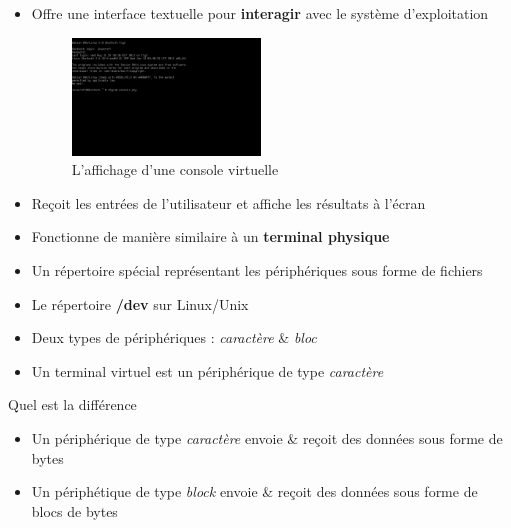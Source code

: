 \begin{frame}

	\begin{itemize}[<+->]
		\item Offre une interface textuelle pour \textbf{interagir} avec le système d'exploitation
			\begin{figure}
				\centering
				\includegraphics[width=5cm]{images/virtual_console.png}
				\caption{L'affichage d'une console virtuelle}
			\end{figure}
		\item Reçoit les entrées de l'utilisateur et affiche les résultats à l'écran

		\item Fonctionne de manière similaire à un \textbf{terminal physique}

	\end{itemize}

\end{frame}

\begin{frame}

	\begin{itemize}[<+->]

		\item Un répertoire spécial représentant les périphériques sous forme de fichiers

		\item Le répertoire \textbf{/dev} sur Linux/Unix
               
		\item Deux types de périphériques : \textit{caractère} \& \textit{bloc}
               
		\item Un terminal virtuel est un périphérique de type \textit{caractère}

	\end{itemize}

	\begin{block}{Quel est la différence}
		\begin{itemize}
			\item Un périphérique de type \textit{caractère} envoie \& reçoit des données sous forme de bytes
			\item Un périphétique de type \textit{block} envoie \& reçoit des données sous forme de blocs de bytes
		\end{itemize}
	\end{block}

\end{frame}

